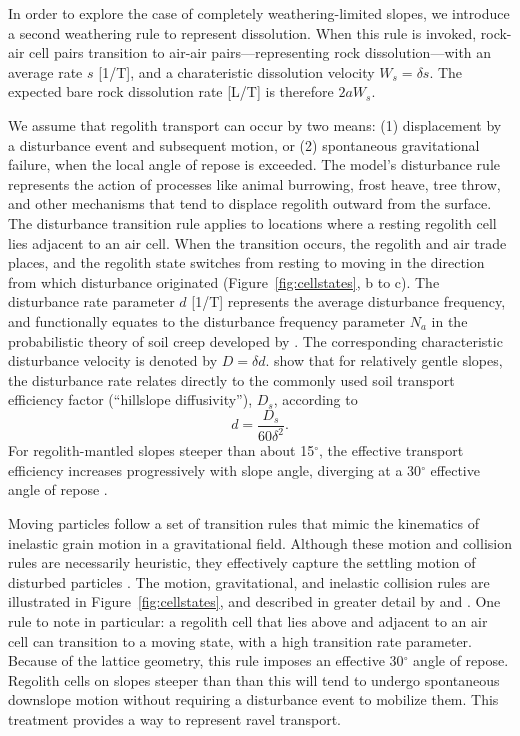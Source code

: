 In order to explore the case of completely weathering-limited slopes, we introduce a second weathering rule to represent dissolution. When this rule is invoked, rock-air cell pairs transition to air-air pairs---representing rock dissolution---with an average rate $s$ [1/T], and a charateristic dissolution velocity $W_s = \delta s$. The expected bare rock dissolution rate [L/T] is therefore $2 a W_s$.

We assume that regolith transport can occur by two means: (1) displacement by a disturbance event and subsequent motion, or (2) spontaneous gravitational failure, when the local angle of repose is exceeded. The model's disturbance rule represents the action of processes like animal burrowing, frost heave, tree throw, and other mechanisms that tend to displace regolith outward from the surface. The disturbance transition rule applies to locations where a resting regolith cell lies adjacent to an air cell. When the transition occurs, the regolith and air trade places, and the regolith state switches from resting to moving in the direction from which disturbance originated (Figure~\ref{fig:cellstates}, b to c). The disturbance rate parameter $d$ [1/T] represents the average disturbance frequency, and functionally equates to the disturbance frequency parameter $N_a$ in the probabilistic theory of soil creep developed by \citet{furbish2009statistical}. The corresponding characteristic disturbance velocity is denoted by $D=\delta d$.  \citet{tucker2018lattice} show that for relatively gentle slopes, the disturbance rate relates directly to the commonly used soil transport efficiency factor (``hillslope diffusivity''), $D_s$, according to
\begin{equation}
d = \frac{D_s}{60 \delta^2}.
\end{equation}
For regolith-mantled slopes steeper than about 15$^\circ$, the effective transport efficiency increases progressively with slope angle, diverging at a 30$^\circ$ effective angle of repose \citep[][their Figure 10]{tucker2018lattice}.

Moving particles follow a set of transition rules that mimic the kinematics of inelastic grain motion in a gravitational field. Although these motion and collision rules are necessarily heuristic, they effectively capture the settling motion of disturbed particles \citep{furbish2009statistical}. The motion, gravitational, and inelastic collision rules are illustrated in Figure~\ref{fig:cellstates}, and described in greater detail by \citet{tucker2016celllab} and \citet{tucker2018lattice}. One rule to note in particular: a regolith cell that lies above and adjacent to an air cell can transition to a moving state, with a high transition rate parameter. Because of the lattice geometry, this rule imposes an effective 30$^\circ$ angle of repose. Regolith cells on slopes steeper than than this will tend to undergo spontaneous downslope motion without requiring a disturbance event to mobilize them. This treatment provides a way to represent ravel transport.

